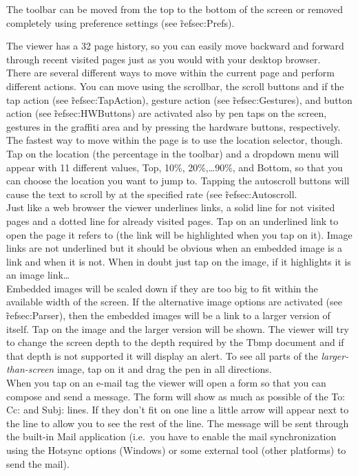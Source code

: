 The toolbar can be moved from the top to the bottom of the screen or
removed completely using preference settings (see \~ref{sec:Prefs}).

The viewer has a 32 page history, so you can easily move backward and 
forward through recent visited pages just as you would with your desktop 
browser.\\

There are several different ways to move within the current page and
perform different actions. You can move using the scrollbar, the scroll
buttons and if the tap action (see \~ref{sec:TapAction}), gesture action
(see \~ref{sec:Gestures}), and button action (see \~ref{sec:HWButtons})
are activated also by pen taps on the screen, gestures in the graffiti area
and by pressing the hardware buttons, respectively. The fastest way to
move within the page is to use the location selector, though. Tap on the
location (the percentage in the toolbar) and a dropdown menu will appear
with 11 different values, Top, 10\%, 20\%,\ldots 90\%, and Bottom, 
so that you can choose the location you want to jump to. Tapping the 
autoscroll buttons will cause the text to scroll by at the specified
rate (see \~ref{sec:Autoscroll}.\\

Just like a web browser the viewer underlines links, a solid line for
not visited pages and a dotted line for already visited pages. Tap on
an underlined link to open the page it refers to (the link will be
highlighted when you tap on it). Image links are not underlined but
it should be obvious when an embedded image is a link and when it
is not. When in doubt just tap on the image, if it highlights it is
an image link\ldots\\ 

Embedded images will be scaled down if they are too big to fit within
the available width of the screen. If the alternative image options
are activated (see \~ref{sec:Parser}), then the embedded images will 
be a link to a larger version of itself. Tap on the image and the 
larger version will be shown. The viewer will try to change the screen 
depth to the depth required by the Tbmp document and if that depth is 
not supported it will display an alert. To see all parts of the 
\emph{larger-than-screen} image, tap on it and drag the pen in all 
directions.\\

When you tap on an e-mail tag the viewer will open a form so that 
you can compose and send a message. The form will show as much as 
possible of the To: Cc: and Subj: lines. If they don't fit on one 
line a little arrow will appear next to the line to allow you to 
see the rest of the line. The message will be sent through the 
built-in Mail application (i.e.\ you have to enable the mail 
synchronization using the Hotsync options (Windows) or some external 
tool (other platforms) to send the mail).\\

